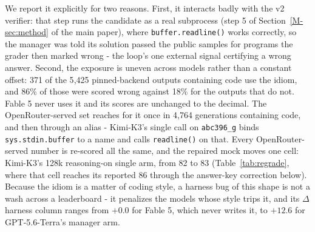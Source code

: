 \documentclass[journal,onecolumn]{IEEEtran}
\begin{document}
We report it explicitly for two reasons. First, it interacts badly with the v2 verifier: that step
runs the candidate as a real subprocess (step 5 of Section~\ref{M-sec:method} of the main paper), where
\texttt{buffer.readline()} works correctly, so the manager was told its solution passed the public
samples for programs the grader then marked wrong - the loop's one external signal certifying a
wrong answer. Second, the exposure is uneven across models rather than a constant offset: 371 of the
5{,}425 pinned-backend outputs containing code use the idiom, and 86\% of those were scored wrong
against 18\% for the outputs that do not. Fable 5 never uses it and its scores are unchanged to the
decimal. The OpenRouter-served set reaches for it once in 4{,}764 generations containing code, and
then through an alias - Kimi-K3's single call on \texttt{abc396\_g} binds
\texttt{sys.stdin.buffer} to a name and calls \texttt{readline()} on that. Every OpenRouter-served
number is re-scored all the same, and the repaired mock moves one cell: Kimi-K3's 128k
reasoning-on single arm, from 82 to 83 (Table~\ref{tab:regrade}, where that cell reaches its
reported 86 through the answer-key correction below). Because the idiom is a matter of coding
style, a harness bug of this shape is not a wash across a leaderboard - it penalizes the models
whose style trips it, and its $\Delta$ harness column ranges from $+0.0$ for Fable 5, which
never writes it, to $+12.6$ for GPT-5.6-Terra's manager arm.
\end{document}
